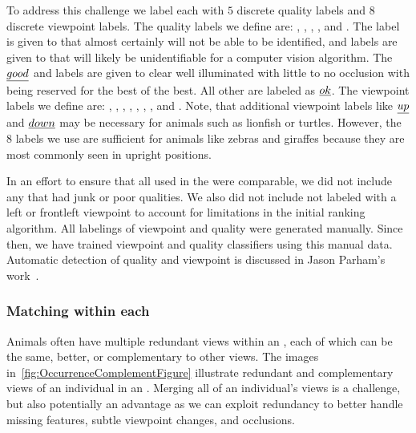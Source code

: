             To address this challenge we label each \annot{} with $5$ discrete quality labels and $8$ discrete viewpoint
            labels. The quality labels we define are: \qualJunk{}, \qualPoor{}, \qualOk{}, \qualGood{}, and
            \qualExcellent{}. The \qualJunk{} label is given to \annots{} that almost certainly will not be able to be
            identified, and \qualPoor{} labels are given to \annots{} that will likely be unidentifiable for a computer
            vision algorithm. The $\emph{good}{}$ and \qualExcellent{} labels are given to clear well illuminated
            \annots{} with little to no occlusion with \qualExcellent{} being reserved for the best of the best. All
            other \annots{} are labeled as $\emph{ok}$. The viewpoint labels we define are: \vpFront{}, \vpFrontLeft{},
            \vpLeft{}, \vpBackLeft{}, \vpBack{}, \vpBackRight{}, \vpBack{}, and \vpFrontRight{}. Note, that additional
            viewpoint labels like $\emph{up}{}$ and $\emph{down}{}$ may be necessary for animals such as lionfish or turtles.
            However, the $8$ labels we use are sufficient for animals like zebras and giraffes because they are most
            commonly seen in upright positions.

            In an effort to ensure that all \annots{} used in the \GZC{} were comparable, we did not include any
            \annot{} that had junk or poor qualities. We also did not include \annots{} not labeled with a left or
            frontleft viewpoint to account for limitations in the initial ranking algorithm. All labelings of
            viewpoint and quality were generated manually. Since then, we have trained viewpoint and quality
            classifiers using this manual data. Automatic detection of quality and viewpoint is discussed in Jason
            Parham's work~\cite{parham_photographic_2015}.

        \subsubsection{Matching within each \occurrence{}} %
            Animals often have multiple redundant views within an \occurrence{}, each of which can be the same,
            better, or complementary to other views. The images in~\cref{fig:OccurrenceComplementFigure} illustrate
            redundant and complementary views of an individual in an \occurrence{}. Merging all of an individual's
            views is a challenge, but also potentially an advantage as we can exploit redundancy to better handle
            missing features, subtle viewpoint changes, and occlusions.

